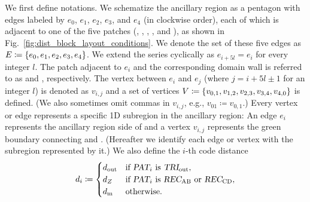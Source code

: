 \documentclass[
 prx,
 reprint,
 superscriptaddress,
 longbibliography,
 dvipsnames
]{revtex4-2}
\begin{document}
We first define notations.
We schematize the ancillary region as a pentagon with edges labeled by $e_0$, $e_1$, $e_2$, $e_3$, and $e_4$ (in clockwise order), each of which is adjacent to one of the five patches (\patchout, \patchab, \patchcd, \patchalpha, and \patchbeta), as shown in Fig.~\ref{fig:dist_block_layout_conditions}.
We denote the set of these five edges as $E \coloneqq \qty{e_0, e_1, e_2, e_3, e_4}$.
We extend the series cyclically as $e_{i + 5l} = e_i$ for every integer $l$.
The patch adjacent to $e_i$ and the corresponding domain wall is referred to as  and , respectively.
The vertex between $e_i$ and $e_j$ (where $j = i + 5l \pm 1$ for an integer $l$) is denoted as $v_{i,j}$ and a set of vertices $V \coloneqq \qty{v_{0,1}, v_{1,2}, v_{2,3}, v_{3,4}, v_{4,0}}$ is defined.
(We also sometimes omit commas in $v_{i,j}$, e.g., $v_{01} \coloneqq v_{0,1}$.)
Every vertex or edge represents a specific 1D subregion in the ancillary region:
An edge $e_i$ represents the ancillary region side of  and a vertex $v_{i,j}$ represents the green boundary connecting  and .
(Hereafter we identify each edge or vertex with the subregion represented by it.)
We also define the $i$-th code distance
\begin{align*}
    d_i \coloneqq \begin{cases}
        \dout & \text{if \patch{i} is \patchout}, \\ 
        \dz & \text{if \patch{i} is \patchab or \patchcd}, \\
        \dm & \text{otherwise}. \\
    \end{cases}
\end{align*}

\end{document}
